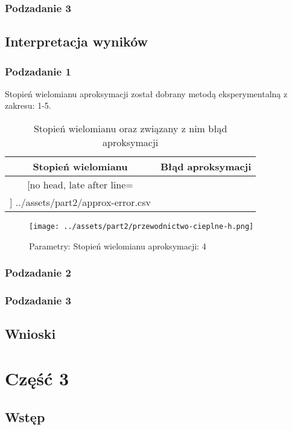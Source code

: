\documentclass[
	12pt, %
]{fphw}
\begin{document}
\subsubsection{Podzadanie 3}


\newpage

\subsection{Interpretacja wyników}
\subsubsection{Podzadanie 1}
Stopień wielomianu aproksymacji został dobrany metodą eksperymentalną z zakresu: 1-5.

\begin{table}[H]
	\centering
	\begin{tabular}{|c|c|}\hline%
	Stopień wielomianu & Błąd aproksymacji \\\hline
	\csvreader[no head, late after line=\\\hline]%
	{../assets/part2/approx-error.csv}{}%
	{\thecsvrow&\csvcoli}%
	\end{tabular}
	\caption{Stopień wielomianu oraz związany z nim błąd aproksymacji}
	\label{tab:approx-error}
\end{table}

\begin{figure}[H]
	\texttt{[image: ../assets/part2/przewodnictwo-cieplne-h.png]}
	\caption{Parametry: Stopień wielomianu aproksymacji: 4}
	\label{fig:przewodnictwo-h}
\end{figure}

\subsubsection{Podzadanie 2}
\subsubsection{Podzadanie 3}
\subsection{Wnioski}
\section{Część 3}
\subsection{Wstęp}
\end{document}
